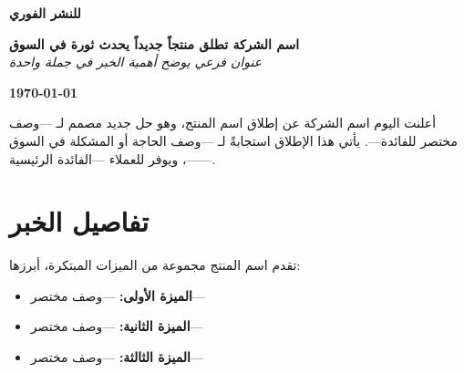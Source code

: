 \documentclass[11pt,a4paper]{article}
\begin{document}
\thispagestyle{fancy}
\begin{center}
\noindent\colorbox{accent}{\parbox{\dimexpr\textwidth-2\fboxsep\relax}{%
\centering
\color{white}\Large\bfseries للنشر الفوري\quad\textemdash\quad{}%
}}
\end{center}

\vspace{0.8em}

\begin{center}
{\LARGE\bfseries\color{accentdark} اسم الشركة تطلق منتجاً جديداً يحدث ثورة في السوق}\\[0.6em]
{\large\itshape عنوان فرعي يوضح أهمية الخبر في جملة واحدة}
\end{center}

\vspace{0.6em}

\begin{flushleft}
\textbf{ \textemdash{} \today}
\end{flushleft}

\vspace{0.4em}

أعلنت اليوم اسم الشركة عن إطلاق اسم المنتج، وهو حل جديد مصمم لـ%
---وصف مختصر للفائدة---. يأتي هذا الإطلاق استجابةً لـ%
---وصف الحاجة أو المشكلة في السوق---، ويوفر للعملاء%
---الفائدة الرئيسية---.

\section{تفاصيل الخبر}

تقدم اسم المنتج مجموعة من الميزات المبتكرة، أبرزها:
\begin{itemize}[topsep=0.3em,itemsep=0.2em]
    \item \textbf{الميزة الأولى:} ---وصف مختصر---
    \item \textbf{الميزة الثانية:} ---وصف مختصر---
    \item \textbf{الميزة الثالثة:} ---وصف مختصر---
\end{itemize}
\end{document}
